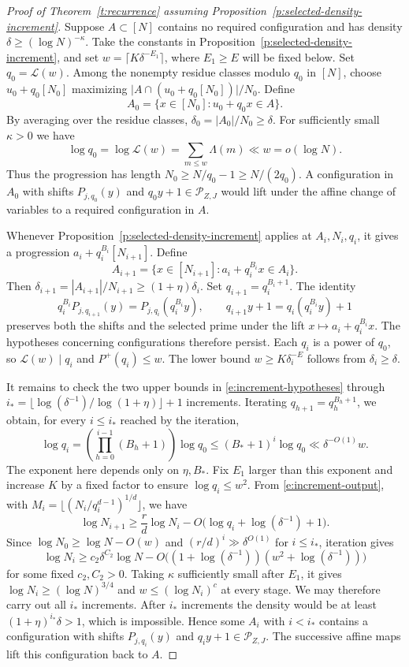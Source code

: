\documentclass[12pt]{amsart}
\newcommand{\1}{\mathbf 1}
\theoremstyle{definition}
\begin{document}
\begin{proof}[Proof of Theorem~\ref{t:recurrence} assuming
Proposition~\ref{p:selected-density-increment}]
Suppose \(A\subset[N]\) contains no required configuration and has
density \(\delta\ge(\log N)^{-\kappa}\). Take the constants in
Proposition~\ref{p:selected-density-increment}, and set
\(w=\lceil K\delta^{-E_1}\rceil\), where \(E_1\ge E\) will be fixed below.
Set \(q_0=\mathcal L(w)\). Among the nonempty residue classes
modulo \(q_0\) in \([N]\), choose \(u_0+q_0[N_0]\) maximizing
\(\lvert A\cap(u_0+q_0[N_0])\rvert/N_0\). Define
\[
 A_0=\{x\in[N_0]:u_0+q_0x\in A\}.
\]
By averaging over the residue classes, \(\delta_0=|A_0|/N_0\ge\delta\).
For sufficiently small \(\kappa>0\) we have
\[\log q_0= \log\mathcal L(w)=\sum_{m\le w}\Lambda(m)\ll w=o(\log N).\] 
Thus the progression
has length \(N_0\ge N/q_0-1\ge N/(2q_0)\).  A configuration
in \(A_0\) with shifts \(P_{j,q_0}(y)\) and \(q_0y+1\in\mathcal P_{Z,J}\)
would lift under the affine change of variables to a required
configuration in \(A\).

Whenever Proposition~\ref{p:selected-density-increment} applies at
\(A_i,N_i,q_i\), it gives a progression \(a_i+q_i^{B_i}[N_{i+1}]\).
Define
\[
 A_{i+1}=\{x\in[N_{i+1}]:a_i+q_i^{B_i}x\in A_i\}.
\]
Then \(\delta_{i+1}=|A_{i+1}|/N_{i+1}\ge(1+\eta)\delta_i\).
Set \(q_{i+1}=q_i^{B_i+1}\). The identity
\[
 q_i^{B_i}P_{j,q_{i+1}}(y)=P_{j,q_i}(q_i^{B_i}y),
 \qquad q_{i+1}y+1=q_i(q_i^{B_i}y)+1
\]
preserves both the shifts and the selected prime under the lift
\(x\mapsto a_i+q_i^{B_i}x\). The hypotheses concerning configurations
therefore persist. Each \(q_i\) is a power of \(q_0\), so
\(\mathcal L(w)\mid q_i\) and \(P^+(q_i)\le w\). The lower bound
\(w\ge K\delta_i^{-E}\) follows from \(\delta_i\ge\delta\).

It remains to check the two upper bounds in
\eqref{e:increment-hypotheses} through
\(i_*=\lfloor\log(\delta^{-1})/\log(1+\eta)\rfloor+1\) increments.
Iterating \(q_{h+1}=q_h^{B_h+1}\), we obtain, for every
\(i\le i_*\) reached by the iteration,
\[
 \log q_i
 =\left(\prod_{h=0}^{i-1}(B_h+1)\right)\log q_0
 \le (B_*+1)^i\log q_0
 \ll \delta^{-O(1)}w.
\]
The exponent here depends only on \(\eta,B_*\). Fix \(E_1\) larger than
this exponent and increase \(K\) by a fixed factor to ensure
\(\log q_i\le w^2\). From \eqref{e:increment-output}, with
\(M_i=\lfloor(N_i/q_i^{d-1})^{1/d}\rfloor\), we have
\[
 \log N_{i+1}\ge \frac rd\log N_i
    -O\bigl(\log q_i+\log(\delta^{-1})+1\bigr).
\]
Since \(\log N_0\ge\log N-O(w)\) and
\((r/d)^i\gg \delta^{O(1)}\) for \(i\le i_*\), iteration gives
\[
 \log N_i\ge c_2\delta^{C_2}\log N
 -O\bigl((1+\log(\delta^{-1}))(w^2+\log(\delta^{-1}))\bigr)
\]
for some fixed \(c_2,C_2>0\).  Taking \(\kappa\) sufficiently small after \(E_1\), it gives
\(\log N_i\ge(\log N)^{3/4}\) and
\(w\le(\log N_i)^c\) at every stage. We may therefore carry out all
\(i_*\) increments. After \(i_*\) increments the density would be at least
\((1+\eta)^{i_*}\delta>1\), which is impossible. Hence some \(A_i\) with \(i<i_*\) contains
a configuration with shifts \(P_{j,q_i}(y)\) and
\(q_i y+1\in\mathcal P_{Z,J}\). The successive affine maps lift this
configuration back to \(A\).
\end{proof}
\end{document}
